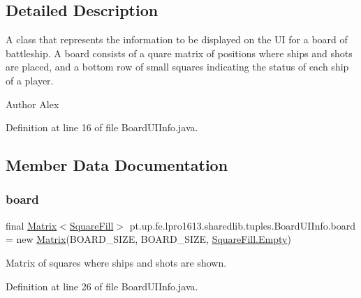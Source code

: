 \subsection{Detailed Description}
A class that represents the information to be displayed on the UI for a board of battleship. A board consists of a quare matrix of positions where ships and shots are placed, and a bottom row of small squares indicating the status of each ship of a player.

\begin{DoxyAuthor}{Author}
Alex 
\end{DoxyAuthor}


Definition at line 16 of file Board\+U\+I\+Info.\+java.



\subsection{Member Data Documentation}
\hypertarget{classpt_1_1up_1_1fe_1_1lpro1613_1_1sharedlib_1_1tuples_1_1_board_u_i_info_ae1dbe1c7d036dd75daa2a97113db5471}{}\label{classpt_1_1up_1_1fe_1_1lpro1613_1_1sharedlib_1_1tuples_1_1_board_u_i_info_ae1dbe1c7d036dd75daa2a97113db5471} 
\subsubsection{\texorpdfstring{board}{board}}
{\footnotesize\ttfamily final \hyperlink{classpt_1_1up_1_1fe_1_1lpro1613_1_1sharedlib_1_1utils_1_1_matrix}{Matrix}$<$\hyperlink{enumpt_1_1up_1_1fe_1_1lpro1613_1_1sharedlib_1_1tuples_1_1_board_u_i_info_1_1_square_fill}{Square\+Fill}$>$ pt.\+up.\+fe.\+lpro1613.\+sharedlib.\+tuples.\+Board\+U\+I\+Info.\+board = new \hyperlink{classpt_1_1up_1_1fe_1_1lpro1613_1_1sharedlib_1_1utils_1_1_matrix}{Matrix}(B\+O\+A\+R\+D\+\_\+\+S\+I\+ZE, B\+O\+A\+R\+D\+\_\+\+S\+I\+ZE, \hyperlink{enumpt_1_1up_1_1fe_1_1lpro1613_1_1sharedlib_1_1tuples_1_1_board_u_i_info_1_1_square_fill_af67b97ac891abc7f497730b69ed2225c}{Square\+Fill.\+Empty})}

Matrix of squares where ships and shots are shown. 

Definition at line 26 of file Board\+U\+I\+Info.\+java.

